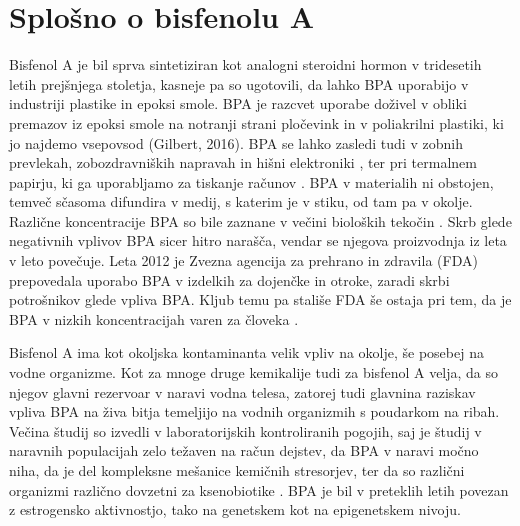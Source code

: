 \documentclass[a4paper, 11pt]{article}
\begin{document}
\section*{Splošno o bisfenolu A}
Bisfenol A je bil sprva sintetiziran kot analogni steroidni hormon v tridesetih letih prejšnjega stoletja, kasneje pa so ugotovili, da lahko BPA uporabijo v industriji plastike in epoksi smole. BPA je razcvet uporabe doživel v obliki premazov iz epoksi smole na notranji strani pločevink in v poliakrilni plastiki, ki jo najdemo vsepovsod {\color{red} (Gilbert, 2016)}. BPA se lahko zasledi tudi v zobnih prevlekah, zobozdravniških napravah in hišni elektroniki \parencite{yuan2019bisphenol}, ter pri termalnem papirju, ki ga uporabljamo za tiskanje računov \parencite{bernier2017handling}. BPA v materialih ni obstojen, temveč sčasoma difundira v medij, s katerim je v stiku, od tam pa v okolje. Različne koncentracije BPA so bile zaznane v večini bioloških tekočin \parencite{yuan2019bisphenol}. Skrb glede negativnih vplivov BPA sicer hitro narašča, vendar se njegova proizvodnja iz leta v leto povečuje. Leta 2012 je Zvezna agencija za prehrano in zdravila (FDA) prepovedala uporabo BPA v izdelkih za dojenčke in otroke, zaradi skrbi potrošnikov glede vpliva BPA. Kljub temu pa stališe FDA še ostaja pri tem, da je BPA v nizkih koncentracijah varen za človeka \parencite{mirmira2014bisphenol}.

Bisfenol A ima kot okoljska kontaminanta velik vpliv na okolje, še posebej na vodne organizme. Kot za mnoge druge kemikalije tudi za bisfenol A velja, da so njegov glavni rezervoar v naravi  vodna telesa, zatorej tudi glavnina raziskav vpliva BPA na živa bitja temeljijo na vodnih organizmih s poudarkom na ribah. Večina študij so izvedli v laboratorijskih kontroliranih pogojih, saj je študij v naravnih populacijah zelo težaven na račun dejstev, da BPA v naravi močno niha, da je del kompleksne mešanice kemičnih stresorjev, ter da so različni organizmi različno dovzetni za ksenobiotike \parencite{canesi2015environmental}. BPA je bil v preteklih letih povezan z estrogensko aktivnostjo, tako na genetskem kot na epigenetskem nivoju. 
\end{document}
